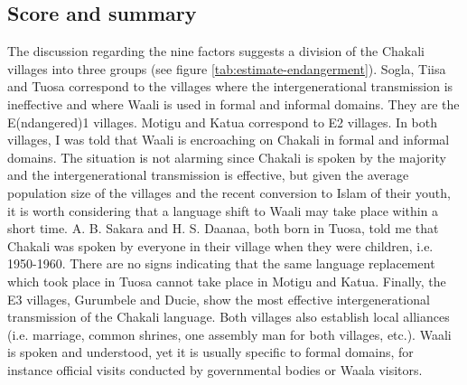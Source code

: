\subsection{Score and summary}
\label{sec:SOC-overall-vitality}

The discussion regarding the nine factors suggests a division of the Chakali
villages into three groups  (see figure \ref{tab:estimate-endangerment}). 
Sogla,
Tiisa and Tuosa correspond to the villages where the intergenerational
transmission is ineffective and where Waali is used in formal and informal
domains. They are  the E(ndangered)1 villages. Motigu and Katua correspond to E2
villages. In both villages, I was told that Waali is encroaching on  Chakali in
formal and informal domains. The situation is not alarming since Chakali is
spoken by the majority and  the intergenerational transmission is effective, but
given the average population size of the villages and the recent conversion to
Islam of their youth, it is worth considering that a language shift to Waali may
take place within a short time.  A. B. Sakara and H. S. Daanaa, both born in
Tuosa, told me that Chakali was spoken by everyone in their village when they
were children, i.e. 1950-1960. There  are no signs indicating that the same 
language replacement which took place in Tuosa  cannot take place in Motigu and
Katua. Finally, the E3 villages, Gurumbele and Ducie, show the most effective
intergenerational transmission of the Chakali language. Both villages also
establish local alliances (i.e. marriage, common shrines, one assembly man for
both villages, etc.). Waali is spoken and understood, yet it is usually specific
to formal domains, for instance  official visits conducted by governmental
bodies or  Waala visitors.


